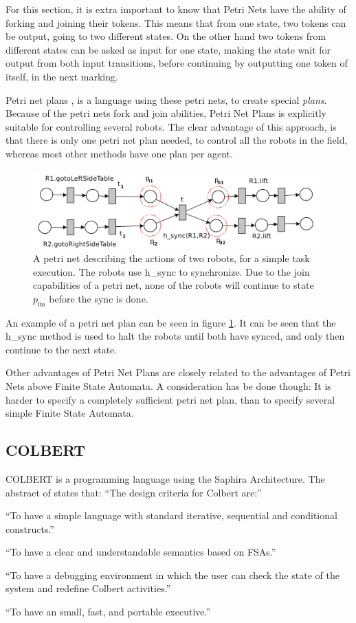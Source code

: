 \documentclass[a4paper,10pt]{article}
\begin{document}
For this section, it is extra important to know that Petri Nets have the ability
of forking and joining their tokens. This means that from one state, two tokens
can be output, going to two different states. On the other hand two tokens from
different states can be asked as input for one state, making the state wait for
output from both input transitions, before continuing by outputting one token of
itself, in the next marking.

Petri net plans \cite{ziparo2011petri}, is a language using these petri nets, to
create special \textit{plans}. Because of the petri nets fork and join
abilities, Petri Net Plans is explicitly suitable for controlling several
robots.  The clear advantage of this approach, is that there is only one
petri net plan needed, to control all the robots in the field, whereas most
other methods have one plan per agent. 

\begin{figure}
    \centering
    \includegraphics[width=.8\textwidth]{images/petriNet.png}
    \caption{A petri net describing the actions of two robots, for a simple task
    execution. The robots use h\_sync to synchronize. Due to the join
    capabilities of a petri net, none of the robots will continue to state
    $p_{0n}$ before the sync is done.}
    \label{fig:petri}
\end{figure}

An example of a petri net plan can be seen in figure \ref{fig:petri}. It can be
seen that the h\_sync method is used to halt the robots until both have synced,
and only then continue to the next state.

Other advantages of Petri Net Plans are closely related to the advantages of
Petri Nets above Finite State Automata. A consideration has be done though: It
is harder to specify a completely sufficient petri net plan, than to specify
several simple Finite State Automata.

\subsection{COLBERT}
COLBERT is a programming language using the Saphira Architecture. 
The abstract of \cite{konolige1997colbert} states that: 
``The design criteria for Colbert are:''
\begin{enumerate*}
\item ``To have a simple language with standard iterative, sequential and
conditional constructs.''
\item ``To have a clear and understandable semantics based on FSAs.''
\item ``To have a debugging environment in which the user can check the state of
the system and redefine Colbert activities.''
\item ``To have an small, fast, and portable executive.''
\end{enumerate*}
\end{document}
